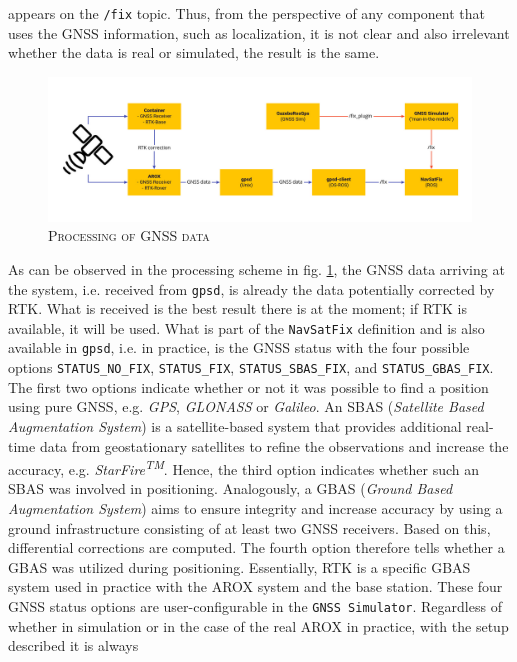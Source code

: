 \documentclass[english, master, utf8]{base/thesis_KBS}
\newcommand{\code}[1]{\colorbox{light-gray}{\texttt{#1}}}
\begin{document}
appears on the \code{/fix} topic. Thus, from the perspective of any component that uses the GNSS information, such as localization, it is not clear and also irrelevant whether the
data is real or simulated, the result is the same.
\begin{figure}[H]
    \centering
    \includegraphics[width=\textwidth]{pics/GNSS_comm.png}
    \caption{\textsc{Processing of GNSS data}}
    \label{fig:gnss_communication}
\end{figure}
\noindent
As can be observed in the processing scheme in fig. \ref{fig:gnss_communication}, the GNSS data arriving at the system,
i.e. received from \code{gpsd}, is already the data potentially corrected by RTK. What is received is the best result there is at the moment; if RTK is available, it will be used.
What is part of the \code{NavSatFix} definition and is also available in \code{gpsd}, i.e. in practice, is the GNSS status with the four possible options \code{STATUS\_NO\_FIX},
\code{STATUS\_FIX}, \code{STATUS\_SBAS\_FIX}, and \code{STATUS\_GBAS\_FIX}. The first two options indicate whether or not it was possible to find a position using pure GNSS, e.g.
\textit{GPS}, \textit{GLONASS} or \textit{Galileo}. An SBAS (\textit{Satellite Based Augmentation System}) is a satellite-based system that provides additional real-time data from geostationary
satellites to refine the observations and increase the accuracy, e.g. \textit{StarFire\textsuperscript{TM}}. \cite{Dixon:2006} Hence, the third option indicates whether such
an SBAS was involved in positioning. Analogously, a GBAS (\textit{Ground Based Augmentation System}) aims to ensure integrity and increase accuracy
by using a ground infrastructure consisting of at least two GNSS receivers. \cite{GNSS_aug} Based on this, differential corrections are computed. The fourth option therefore
tells whether a GBAS was utilized during positioning. Essentially, RTK is a specific GBAS system used in practice with the AROX system and the base station. These four GNSS status
options are user-configurable in the \code{GNSS Simulator}. Regardless of whether in simulation or in the case of the real AROX in practice, with the setup described it is always
\end{document}
